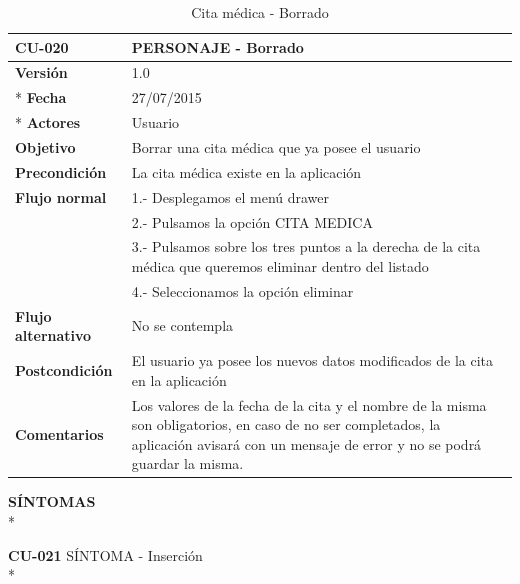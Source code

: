 \documentclass[../pfc.tex]{subfiles}
\begin{document}
		\begin{table}[H]
			\centering
			\begin{tabular}[t]{|p{3cm}|p{9.5cm}|}
				\hline \textbf{CU-020} & \textbf{PERSONAJE - Borrado} \\*
				\hline\hline \textbf{Versión} & 1.0 \\ *
				\hline\hline \textbf{Fecha} & 27/07/2015 \\ *
				\hline\textbf{Actores} 	& Usuario\\*
				\hline \textbf{Objetivo} & Borrar una cita médica que ya posee el usuario\\* 			
				\hline \textbf{Precondición} & La cita médica existe en la aplicación\\* 
				\hline \textbf{Flujo normal} & 1.- Desplegamos el menú drawer \\* 
				& 2.- Pulsamos la opción CITA MEDICA\\*	
				& 3.- Pulsamos sobre los tres puntos a la derecha de la cita médica que queremos eliminar dentro del listado\\*	
				& 4.- Seleccionamos la opción eliminar\\*	
				\hline \textbf{Flujo alternativo} & No se contempla \\* 
				\hline \textbf{Postcondición} & El usuario ya posee los nuevos datos modificados de la cita en la aplicación \\* 
				\hline \textbf{Comentarios}   & Los valores de la fecha de la cita y el nombre de la misma son obligatorios, en caso de no ser completados, la aplicación avisará con un mensaje de error y no se podrá guardar la misma.\\*
				\hline
			\end{tabular}
			\caption{Cita médica - Borrado}
			\label{tabla:caso020}
		\end{table}
		
		
		

	
		
		
		
		\textbf{SÍNTOMAS}\\*
		
		\textbf{CU-021}	SÍNTOMA - Inserción\\*
		
\end{document}
